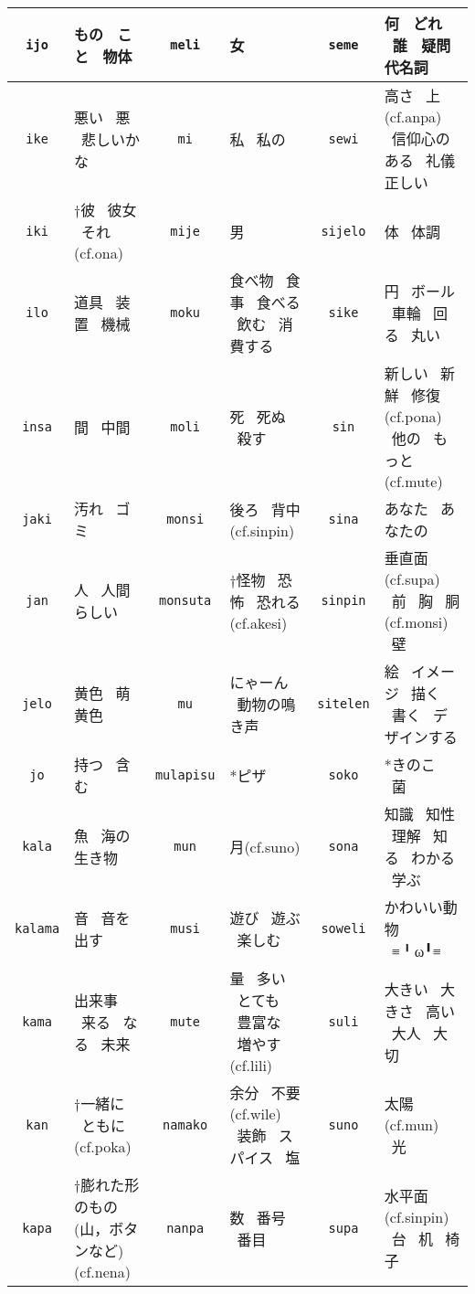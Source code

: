 \documentclass[a4paper,10pt,landscape]{article}
\begin{document}
{\begin{tabular}{|c|l||c|l||c|l|}
\hline \texttt{ijo} & もの \ こと \ 物体  & \texttt{meli} & 女  & \texttt{seme} & 何  \  どれ  \  誰  \  疑問代名詞  \\
\hline \texttt{ike} & 悪い \ 悪 \ 悲しいかな  & \texttt{mi} & 私  \  私の  & \texttt{sewi} & 高さ  \  上(cf.anpa)  \  信仰心のある  \  礼儀正しい  \\
\hline \texttt{iki} & †彼 \ 彼女 \ それ(cf.ona) & \texttt{mije} & 男  & \texttt{sijelo} & 体  \  体調  \\
\hline \texttt{ilo} & 道具 \ 装置 \ 機械  & \texttt{moku} & 食べ物  \  食事  \  食べる  \  飲む  \  消費する  & \texttt{sike} & 円  \  ボール  \  車輪  \  回る  \  丸い  \\
\hline \texttt{insa} & 間 \ 中間  & \texttt{moli} & 死  \  死ぬ  \  殺す  & \texttt{sin} & 新しい  \  新鮮  \  修復(cf.pona)  \  他の  \  もっと(cf.mute)  \\
\hline \texttt{jaki} & 汚れ \ ゴミ  & \texttt{monsi} & 後ろ  \  背中(cf.sinpin)  & \texttt{sina} & あなた  \  あなたの  \\
\hline \texttt{jan} & 人 \ 人間らしい  & \texttt{monsuta} & †怪物  \  恐怖  \  恐れる(cf.akesi)  & \texttt{sinpin} & 垂直面(cf.supa)  \  前  \  胸  \  胴(cf.monsi)  \  壁  \\
\hline \texttt{jelo} & 黄色 \ 萌黄色  & \texttt{mu} & にゃーん  \  動物の鳴き声  & \texttt{sitelen} & 絵  \  イメージ  \  描く  \  書く  \  デザインする  \\
\hline \texttt{jo} & 持つ \ 含む  & \texttt{mulapisu} & *ピザ & \texttt{soko} & *きのこ \ 菌 \\
\hline \texttt{kala} & 魚 \ 海の生き物  & \texttt{mun} & 月(cf.suno)  & \texttt{sona} & 知識  \  知性  \  理解  \  知る  \  わかる  \  学ぶ  \\
\hline \texttt{kalama} & 音 \ 音を出す  & \texttt{musi} & 遊び  \  遊ぶ  \  楽しむ  & \texttt{soweli} & かわいい動物  \  ≡╹ω╹≡  \\
\hline \texttt{kama} & 出来事 \ 来る \ なる \ 未来  & \texttt{mute} & 量  \  多い  \  とても  \  豊富な  \  増やす(cf.lili)  & \texttt{suli} & 大きい  \  大きさ  \  高い  \  大人  \  大切  \\
\hline \texttt{kan} & †一緒に \ ともに(cf.poka)  & \texttt{namako} & 余分  \  不要(cf.wile)  \  装飾  \  スパイス  \  塩  & \texttt{suno} & 太陽(cf.mun)  \  光  \\
\hline \texttt{kapa} & †膨れた形のもの(山，ボタンなど)(cf.nena) & \texttt{nanpa} & 数  \  番号  \  番目  & \texttt{supa} & 水平面(cf.sinpin)  \  台  \  机  \  椅子  \\

\end{tabular}}
\end{document}
